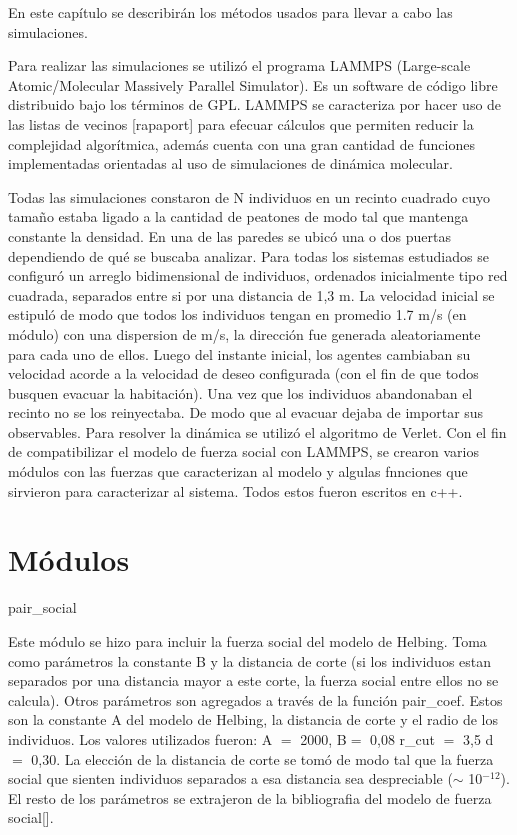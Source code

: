 
\noindent En este capítulo se describirán los métodos usados para llevar a cabo las simulaciones. 

\noindent Para realizar las simulaciones se utilizó el programa LAMMPS (Large-scale Atomic/Molecular Massively Parallel Simulator).
Es un software de código libre distribuido bajo los términos de GPL.
LAMMPS se caracteriza por hacer uso de las listas de vecinos [rapaport] para efecuar cálculos que permiten reducir la
complejidad algorítmica, además cuenta con una gran cantidad de funciones implementadas orientadas al uso de simulaciones
de dinámica molecular. 

\noindent Todas las simulaciones constaron de N individuos en un recinto cuadrado cuyo tamaño estaba ligado a la cantidad de
peatones de modo tal que mantenga constante la densidad. En una de las paredes se ubicó una o dos puertas dependiendo de qué 
se buscaba analizar.
Para todas los sistemas estudiados se configuró un arreglo bidimensional de individuos, ordenados inicialmente tipo
red cuadrada, separados entre si por una distancia de 1,3 m. La velocidad inicial se estipuló de modo que todos los individuos
tengan en promedio 1.7 m/s (en módulo) con una dispersion de m/s, la dirección fue generada aleatoriamente para
cada uno de ellos. Luego del instante inicial, los agentes cambiaban su velocidad acorde a la velocidad de deseo configurada 
(con el fin de que todos busquen evacuar la habitación). Una vez que los individuos abandonaban el recinto no se los reinyectaba.
De modo que al evacuar dejaba de importar sus observables. 
Para resolver la dinámica se utilizó el algoritmo de Verlet. 
\noindent Con el fin de compatibilizar el modelo de fuerza social con LAMMPS, se crearon varios módulos con las fuerzas que
caracterizan al modelo y algulas fnnciones que sirvieron para caracterizar al sistema. Todos estos fueron escritos en c++.

\section{Módulos}

{\Large pair\_social}

Este módulo se hizo para incluir la fuerza social del modelo de Helbing. Toma como parámetros la constante B y la distancia 
de corte (si los individuos estan separados por una distancia mayor a este corte, la fuerza social entre ellos no se calcula).
Otros parámetros son agregados a través de la función pair\_coef. Estos son la constante A del modelo de Helbing, la distancia 
de corte y el radio de los individuos. Los valores utilizados fueron: A $=$ 2000, B$=$ 0,08 r\_cut $=$ 3,5 d $=$ 0,30.
La elección de la distancia de corte se tomó de modo tal que la fuerza social que sienten individuos separados a esa distancia
sea despreciable ($\sim$ 10$^{-12}$). El resto de los parámetros se extrajeron de la bibliografia del modelo de fuerza social[].

